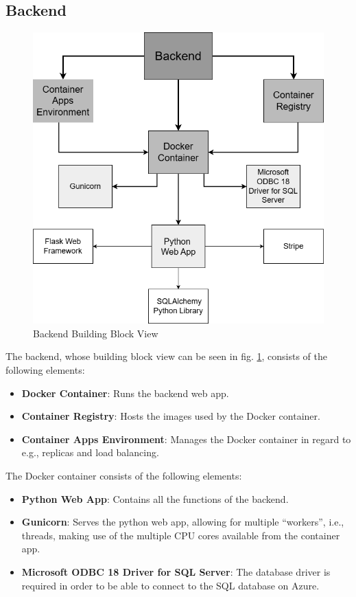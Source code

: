 \subsection{Backend}
\begin{figure}[!h!]
    \centering
    \includegraphics[width=\textwidth]{images/backend_building_block.png}
    \caption{Backend Building Block View}
    \label{fig:backend_building_block_view}
\end{figure}

The backend, whose building block view can be seen in fig. \ref{fig:backend_building_block_view}, consists of the following elements:

\begin{itemize}
    \item \textbf{Docker Container}: Runs the backend web app.
    \item \textbf{Container Registry}: Hosts the images used by the Docker container.
    \item \textbf{Container Apps Environment}: Manages the Docker container in regard to e.g., replicas and load balancing.
\end{itemize}

The Docker container consists of the following elements:

\begin{itemize}
    \item \textbf{Python Web App}: Contains all the functions of the backend.
    \item \textbf{Gunicorn}: Serves the python web app, allowing for multiple “workers”, 
    i.e., threads, making use of the multiple CPU cores available from the container app.
    \item \textbf{Microsoft ODBC 18 Driver for SQL Server}: The database driver is required in order to be able to connect to the SQL database on Azure.
\end{itemize}

